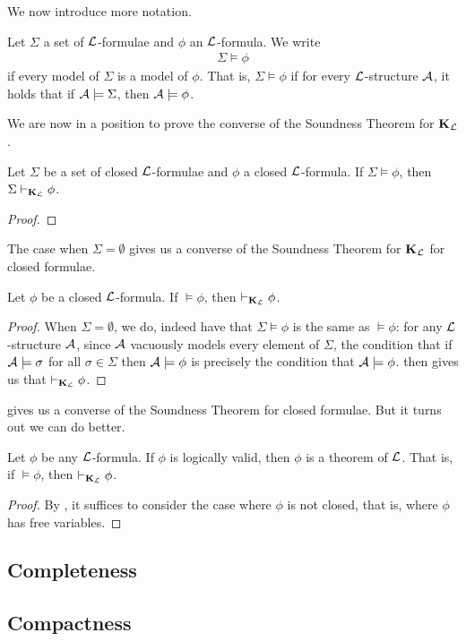 We now introduce more notation.

\begin{boxconvention}
    Let $\Sigma$ a set of $\mathcal{L}$-formulae and $\phi$ an $\mathcal{L}$-formula. We write
    \begin{align*}
        \Sigma \models \phi
    \end{align*}
    if every model of $\Sigma$ is a model of $\phi$. That is, $\Sigma \models \phi$ if for every $\mathcal{L}$-structure $\mathcal{A}$, it holds that if $\mathcal{A} \models \Sigma$, then $\mathcal{A} \models \phi$.
\end{boxconvention}

We are now in a position to prove the converse of the Soundness Theorem for $\mathbf{K}_{\mathcal{L}}$.

\begin{boxtheorem}\label{Ch2:Thm:Generalised_KLCompleteness_Closed_Formulae}
    Let $\Sigma$ be a set of closed $\mathcal{L}$-formulae and $\phi$ a closed $\mathcal{L}$-formula. If $\Sigma \models \phi$, then $\Sigma \vdash_{\mathbf{K}_{\mathcal{L}}} \phi$.
\end{boxtheorem}
\begin{proof}
    \sorry
\end{proof}

The case when $\Sigma = \emptyset$ gives us a converse of the Soundness Theorem for $\mathbf{K}_{\mathcal{L}}$ for closed formulae.

\begin{boxcorollary}\label{Ch2:Cor:KLCompleteness_Closed_Formulae}
    Let $\phi$ be a closed $\mathcal{L}$-formula. If $\models \phi$, then $\vdash_{\mathbf{K}_{\mathcal{L}}} \phi$.
\end{boxcorollary}
\begin{proof}
    When $\Sigma = \emptyset$, we do, indeed have that $\Sigma \models \phi$ is the same as $\models \phi$: for any $\mathcal{L}$-structure $\mathcal{A}$, since $\mathcal{A}$ vacuously models every element of $\Sigma$, the condition that if $\mathcal{A} \models \sigma$ for all $\sigma \in \Sigma$ then $\mathcal{A} \models \phi$ is precisely the condition that $\mathcal{A} \models \phi$.  then gives us that $\vdash_{\mathbf{K}_{\mathcal{L}}} \phi$.
\end{proof}

 gives us a converse of the Soundness Theorem for closed formulae. But it turns out we can do better.

\begin{boxtheorem}\label{Ch2:Thm:Godel_Completeness}
    Let $\phi$ be any $\mathcal{L}$-formula. If $\phi$ is logically valid, then $\phi$ is a theorem of $\mathcal{L}$. That is, if $\models \phi$, then $\vdash_{\mathbf{K}_{\mathcal{L}}} \phi$.
\end{boxtheorem}
\begin{proof}
    By , it suffices to consider the case where $\phi$ is not closed, that is, where $\phi$ has free variables.
    \sorry
\end{proof}

\subsection{Completeness}


\subsection{Compactness}
